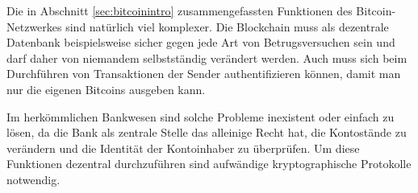 Die in Abschnitt \ref{sec:bitcoinintro} zusammengefassten Funktionen des Bitcoin-Netzwerkes sind natürlich viel komplexer.
Die Blockchain muss als dezentrale Datenbank beispielsweise sicher gegen jede Art von Betrugsversuchen sein und darf daher von niemandem selbstständig verändert werden.
Auch muss sich beim Durchführen von Transaktionen der Sender authentifizieren können, damit man nur die eigenen Bitcoins ausgeben kann.

Im herkömmlichen Bankwesen sind solche Probleme inexistent oder einfach zu lösen, da die Bank als zentrale Stelle das alleinige Recht hat, die Kontostände zu verändern und die Identität der Kontoinhaber zu überprüfen.
Um diese Funktionen dezentral durchzuführen sind aufwändige kryptographische Protokolle notwendig.
